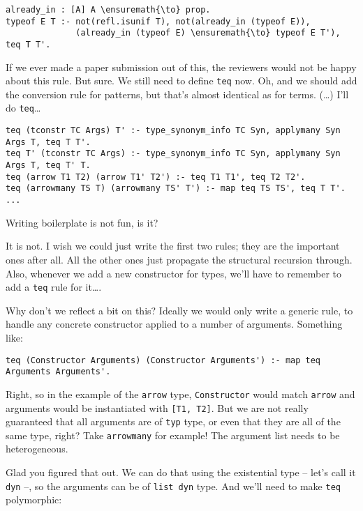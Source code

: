 \begin{verbatim}
already_in : [A] A \ensuremath{\to} prop.
typeof E T :- not(refl.isunif T), not(already_in (typeof E)),
              (already_in (typeof E) \ensuremath{\to} typeof E T'), teq T T'.
\end{verbatim}

\heroSTUDENT{} If we ever made a paper submission out of this, the reviewers
would not be happy about this rule. But sure. We still need to define
\texttt{teq} now. Oh, and we should add the conversion rule for
patterns, but that's almost identical as for terms. (\ldots{}) I'll do
\texttt{teq}\ldots{}

\begin{verbatim}
teq (tconstr TC Args) T' :- type_synonym_info TC Syn, applymany Syn Args T, teq T T'.
teq T' (tconstr TC Args) :- type_synonym_info TC Syn, applymany Syn Args T, teq T' T.
teq (arrow T1 T2) (arrow T1' T2') :- teq T1 T1', teq T2 T2'.
teq (arrowmany TS T) (arrowmany TS' T') :- map teq TS TS', teq T T'.
...
\end{verbatim}

\heroADVISOR{} Writing boilerplate is not fun, is it?

\heroSTUDENT{} It is not. I wish we could just write the first two rules; they
are the important ones after all. All the other ones just propagate the
structural recursion through. Also, whenever we add a new constructor
for types, we'll have to remember to add a \texttt{teq} rule for
it\ldots{}.

\heroADVISOR{} Why don't we reflect a bit on this? Ideally we would only write
a generic rule, to handle any concrete constructor applied to a number
of arguments. Something like:

\begin{verbatim}
teq (Constructor Arguments) (Constructor Arguments') :- map teq Arguments Arguments'.
\end{verbatim}

\heroSTUDENT{} Right, so in the example of the \texttt{arrow} type,
\texttt{Constructor} would match \texttt{arrow} and arguments would be
instantiated with \texttt{{[}T1,\ T2{]}}. But we are not really
guaranteed that all arguments are of \texttt{typ} type, or even that
they are all of the same type, right? Take \texttt{arrowmany} for
example! The argument list needs to be heterogeneous.

\heroADVISOR{} Glad you figured that out. We can do that using the existential
type -- let's call it \texttt{dyn} --, so the arguments can be of
\texttt{list\ dyn} type. And we'll need to make \texttt{teq}
polymorphic:

